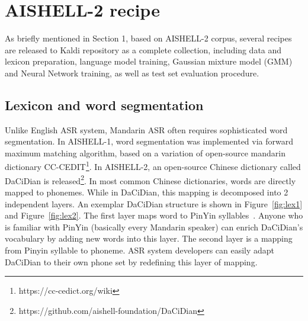 \documentclass[a4paper]{article}
\begin{document}
\section{AISHELL-2 recipe}

As briefly mentioned in Section 1, based on AISHELL-2 corpus, several recipes are released to Kaldi repository as a complete collection, including data and lexicon preparation, language model training, Gaussian mixture model (GMM) and Neural Network training, as well as test set evaluation procedure.

\subsection{Lexicon and word segmentation}

Unlike English ASR system, Mandarin ASR often requires sophisticated word segmentation.
In AISHELL-1, word segmentation was implemented via forward
maximum matching algorithm, based on a variation of open-source mandarin
dictionary CC-CEDIT\footnote{https://cc-cedict.org/wiki}. In AISHELL-2, an
open-source Chinese dictionary called DaCiDian is
released\footnote{https://github.com/aishell-foundation/DaCiDian}. In most
common Chinese dictionaries, words are directly mapped to phonemes. While in
DaCiDian, this mapping is decomposed into 2 independent layers. An exemplar
DaCiDian structure is shown in Figure~\ref{fig:lex1} and Figure~\ref{fig:lex2}. The first layer maps word to PinYin syllables~\cite{pinyin}. Anyone who is
  familiar with PinYin (basically every Mandarin speaker) can enrich DaCiDian's
  vocabulary by adding new words into this layer. The second layer is a mapping from Pinyin syllable to phoneme. ASR system
  developers can easily adapt DaCiDian to their own phone set by redefining this
  layer of mapping.
\end{document}
